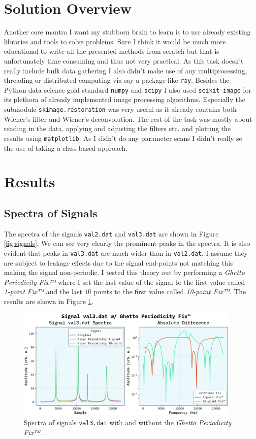 \documentclass[10pt, titlepage, a4paper]{article}
\begin{document}
\section{Solution Overview}
Another core mantra I want my stubborn brain to learn is to use already existing libraries and tools to solve problems. Sure I think it would be much more 
educational to write all the presented methods from scratch but that is unfortunately time consuming and thus not very practical. As this task doesn't really 
include bulk data gathering I also didn't make use of any multiprocessing, threading or distributed computing via say a package like \texttt{ray}. Besides the 
Python data science gold standard \texttt{numpy} and \texttt{scipy} I also used \texttt{scikit-image} for its plethora of already implemented image processing 
algorithms. Especially the submodule \texttt{skimage.restoration} was very useful as it already contains both Wiener's filter and Wiener's deconvolution. The rest 
of the task was mostly about reading in the data, applying and adjusting the filters etc. and plotting the results using \texttt{matplotlib}. As I didn't do any parameter 
scans I didn't really se the use of taking a class-based approach.
\section{Results}
\subsection{Spectra of Signals}
The spectra of the signals \texttt{val2.dat} and \texttt{val3.dat} are shown in Figure \ref{fig:signals}. We can see very clearly the prominent peaks in the spectra.
It is also evident that peaks in \texttt{val3.dat} are much wider than in \texttt{val2.dat}. I assume they are subject to leakage effects due to the 
signal end-points not matching this making the signal non-periodic. I tested this theory out by performing a \textit{Ghetto Periodicity Fix™} where I set the 
last value of the signal to the first value called \textit{1-point Fix™} and the last $10$ points to the first value called \textit{10-point Fix™}. The results are
shown in Figure \ref{fig:periodicity-fix}.

\begin{figure}[H]
    \centering
    \includegraphics[width=0.98\textwidth]{../SpectralAnalysis/Images/fixed-val3.dat.png}
    \caption{Spectra of signals \texttt{val3.dat} with and without the \textit{Ghetto Periodicity Fix™}.}
    \label{fig:periodicity-fix}
\end{figure}
\end{document}
